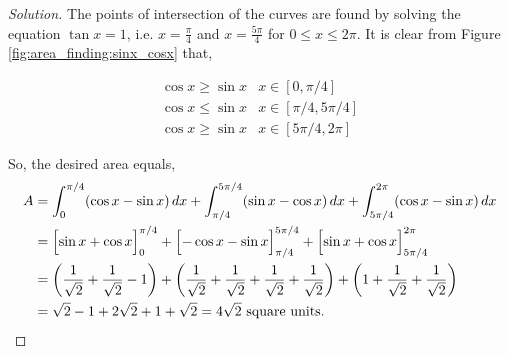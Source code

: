\documentclass[../../main.tex]{subfiles}
\theoremstyle{definition}
\newenvironment{solution}
    {\begin{proof}[Solution]}
    {\end{proof}}
\begin{document}
\begin{solution}
The points of intersection of the curves are found by solving the equation $\tan x=1$, i.e. $x=\frac{\pi}{4}$ and $x=\frac{5\pi}{4}$ for $0\leq x\leq 2\pi$. It is clear from Figure \ref{fig:area_finding:sinx_cosx} that,

\begin{equation*}
\begin{array}{ll}
\cos x \geq \sin x & x \in [0, \pi/4] \\
\cos x \leq \sin x & x \in [\pi/4, 5\pi/4] \\
\cos x \geq \sin x & x \in [5\pi/4, 2\pi]
\end{array}
\end{equation*}

So, the desired area equals,
\begin{align*}
    A &= \int_0^{\pi/4} (\cos x - \sin x)\,dx + \int_{\pi/4}^{5\pi/4} (\sin x - \cos x)\,dx + \int_{5\pi/4}^{2\pi} (\cos x - \sin x)\,dx \\
    &= \Bigl[\sin x + \cos x\Bigr]_0^{\pi/4} + \Bigl[-\cos x - \sin x\Bigr]_{\pi/4}^{5\pi/4} + \Bigl[\sin x + \cos x\Bigr]_{5\pi/4}^{2\pi} \\
    &=\left(\frac{1}{\sqrt{2}}+\frac{1}{\sqrt{2}}-1\right)+\left(\frac{1}{\sqrt{2}}+\frac{1}{\sqrt{2}}+\frac{1}{\sqrt{2}}+\frac{1}{\sqrt{2}}\right)+\left(1+\frac{1}{\sqrt{2}}+\frac{1}{\sqrt{2}}\right) \\
    &=\sqrt{2}-1+2\sqrt{2}+1+\sqrt{2}=4\sqrt{2} \text{ square units.}
\end{align*}
\end{solution}

\pagebreak
\end{document}
